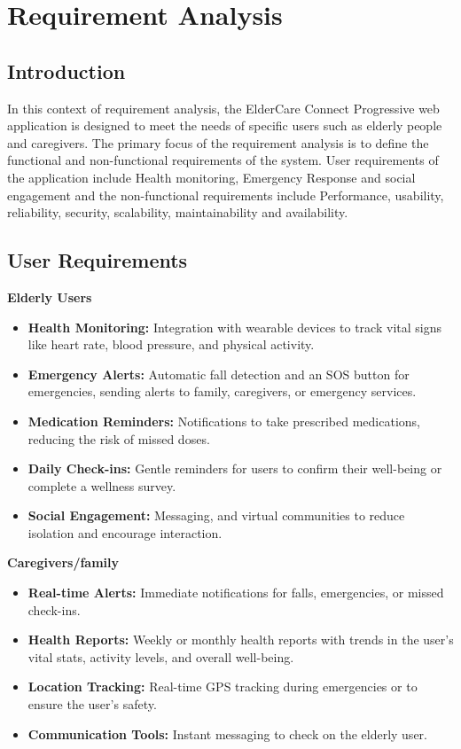 \documentclass[a4paper, 12pt]{article} %
\begin{document}
\section{\textbf{\LARGE Requirement Analysis}}
\subsection{\textbf{\Large Introduction}}
In this context of requirement analysis, the ElderCare Connect Progressive web application is designed to meet the needs of specific users such as elderly people and caregivers. The primary focus of the requirement analysis is to define the functional and non-functional requirements of the system. User requirements of the application include Health monitoring, Emergency Response and social engagement and  the non-functional requirements include Performance, usability, reliability, security, scalability, maintainability and availability.

\subsection{\Large User Requirements} 

\textbf{\large Elderly Users} 
\begin{itemize}
    \item \textbf{Health Monitoring:} Integration with wearable devices to track vital signs like heart rate, blood pressure, and physical activity. 
    \item \textbf{Emergency Alerts:} Automatic fall detection and an SOS button for emergencies, sending alerts to family, caregivers, or emergency services.
    \item \textbf{Medication Reminders:} Notifications to take prescribed medications, reducing the risk of missed doses. 
    \item \textbf{Daily Check-ins:} Gentle reminders for users to confirm their well-being or complete a wellness survey.
    \item \textbf{Social Engagement:} Messaging, and virtual communities to reduce isolation and encourage interaction.
\end{itemize}
\textbf{\large Caregivers/family} 
\begin{itemize}
    \item \textbf{Real-time Alerts:} Immediate notifications for falls, emergencies, or missed check-ins.
    \item \textbf{Health Reports:} Weekly or monthly health reports with trends in the user's vital stats, activity levels, and overall well-being.
    \item \textbf{Location Tracking:} Real-time GPS tracking during emergencies or to ensure the user's safety.
    \item \textbf{Communication Tools:} Instant messaging to check on the elderly user.
\end{itemize}
\end{document}

